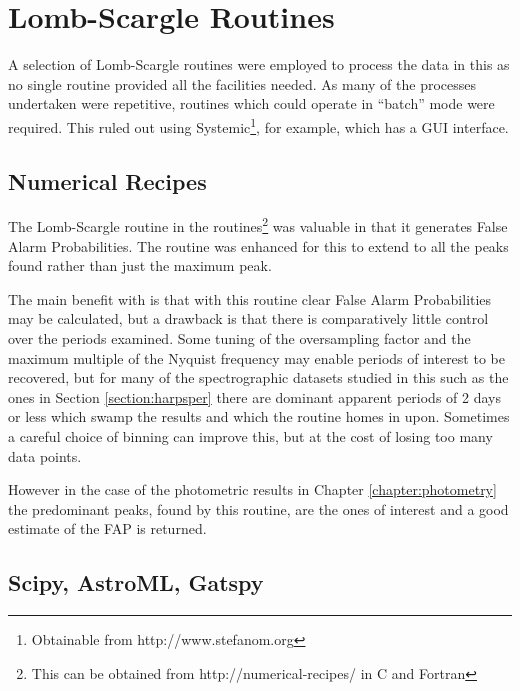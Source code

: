 \chapter{Lomb-Scargle Routines} %
\protect\label{chapter:lsroutines}

A selection of Lomb-Scargle routines were employed to process the data in this {\paperorthesis} as no single routine
provided all the facilities needed. As many of the processes undertaken were repetitive, routines which could operate in
``batch'' mode were required. This ruled out using Systemic\footnote{Obtainable from http://www.stefanom.org}, for
example, which has a GUI interface.

\section{Numerical Recipes}

The Lomb-Scargle routine in the {\numrecs} routines\footnote{This can be obtained from http://numerical-recipes/
  in C and Fortran} was valuable in that it generates False Alarm Probabilities. The routine was enhanced for this
{\paperorthesis} to extend to all the peaks found rather than just the maximum peak.

The main benefit with {\numrecs} is that with this routine clear False Alarm Probabilities may be calculated, but a
drawback is that there is comparatively little control over the periods examined. Some tuning of the oversampling factor
and the maximum multiple of the Nyquist frequency may enable periods of interest to be recovered, but for many of the
spectrographic datasets studied in this {\paperorthesis} such as the {\harps} ones in Section \ref{section:harpsper}
there are dominant apparent periods of 2 days or less which swamp the results and which the routine homes in
upon. Sometimes a careful choice of binning can improve this, but at the cost of losing too many data points.

However in the case of the photometric results in Chapter \ref{chapter:photometry} the predominant peaks, found by this
routine, are the ones of interest and a good estimate of the FAP is returned.

\section{Scipy, AstroML, Gatspy}
\protect\label{section:pythonls}

